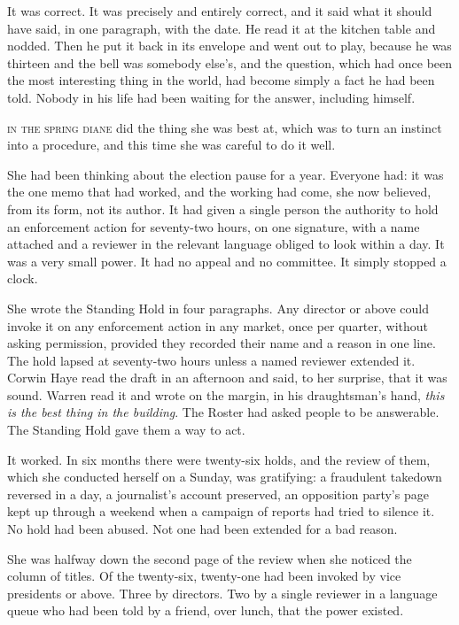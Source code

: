 It was correct. It was precisely and entirely correct, and it said what it should have said, in one paragraph, with the date. He read it at the kitchen table and nodded. Then he put it back in its envelope and went out to play, because he was thirteen and the bell was somebody else's, and the question, which had once been the most interesting thing in the world, had become simply a fact he had been told. Nobody in his life had been waiting for the answer, including himself.


\textsc{in the spring diane} did the thing she was best at, which was to turn an instinct into a procedure, and this time she was careful to do it well.

She had been thinking about the election pause for a year. Everyone had: it was the one memo that had worked, and the working had come, she now believed, from its form, not its author. It had given a single person the authority to hold an enforcement action for seventy-two hours, on one signature, with a name attached and a reviewer in the relevant language obliged to look within a day. It was a very small power. It had no appeal and no committee. It simply stopped a clock.

She wrote the Standing Hold in four paragraphs. Any director or above could invoke it on any enforcement action in any market, once per quarter, without asking permission, provided they recorded their name and a reason in one line. The hold lapsed at seventy-two hours unless a named reviewer extended it. Corwin Haye read the draft in an afternoon and said, to her surprise, that it was sound. Warren read it and wrote on the margin, in his draughtsman's hand, \emph{this is the best thing in the building}. The Roster had asked people to be answerable. The Standing Hold gave them a way to act.

It worked. In six months there were twenty-six holds, and the review of them, which she conducted herself on a Sunday, was gratifying: a fraudulent takedown reversed in a day, a journalist's account preserved, an opposition party's page kept up through a weekend when a campaign of reports had tried to silence it. No hold had been abused. Not one had been extended for a bad reason.

She was halfway down the second page of the review when she noticed the column of titles. Of the twenty-six, twenty-one had been invoked by vice presidents or above. Three by directors. Two by a single reviewer in a language queue who had been told by a friend, over lunch, that the power existed.

